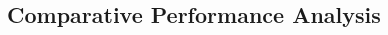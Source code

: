 \documentclass[11pt]{article}
\begin{document}
\begin{multicols}{2}

	\section{Comparative Performance Analysis}


\end{multicols}
\end{document}

